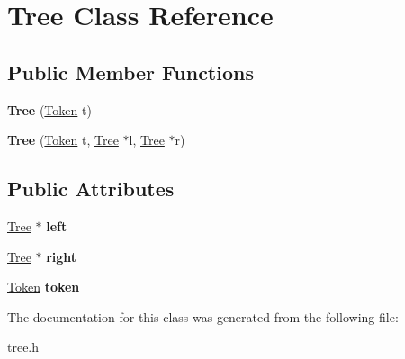\hypertarget{classTree}{\section{Tree Class Reference}
\label{classTree}
}
\subsection*{Public Member Functions}
\begin{DoxyCompactItemize}
\item 
\hypertarget{classTree_a9537bf9697160421ba59178bf5f9d6a1}{{\bfseries Tree} (\hyperlink{classToken}{Token} t)}\label{classTree_a9537bf9697160421ba59178bf5f9d6a1}

\item 
\hypertarget{classTree_a37112c23701604aee9a580eec3b01059}{{\bfseries Tree} (\hyperlink{classToken}{Token} t, \hyperlink{classTree}{Tree} $\ast$l, \hyperlink{classTree}{Tree} $\ast$r)}\label{classTree_a37112c23701604aee9a580eec3b01059}

\end{DoxyCompactItemize}
\subsection*{Public Attributes}
\begin{DoxyCompactItemize}
\item 
\hypertarget{classTree_a462a21f3d3dfd3c257f1ec5516d4e413}{\hyperlink{classTree}{Tree} $\ast$ {\bfseries left}}\label{classTree_a462a21f3d3dfd3c257f1ec5516d4e413}

\item 
\hypertarget{classTree_a970aee4fa6894e2229a0268b224efd27}{\hyperlink{classTree}{Tree} $\ast$ {\bfseries right}}\label{classTree_a970aee4fa6894e2229a0268b224efd27}

\item 
\hypertarget{classTree_a0c9e3a9bcd2fd780b55f9562dcf4b00c}{\hyperlink{classToken}{Token} {\bfseries token}}\label{classTree_a0c9e3a9bcd2fd780b55f9562dcf4b00c}

\end{DoxyCompactItemize}


The documentation for this class was generated from the following file\-:\begin{DoxyCompactItemize}
\item 
tree.\-h\end{DoxyCompactItemize}
